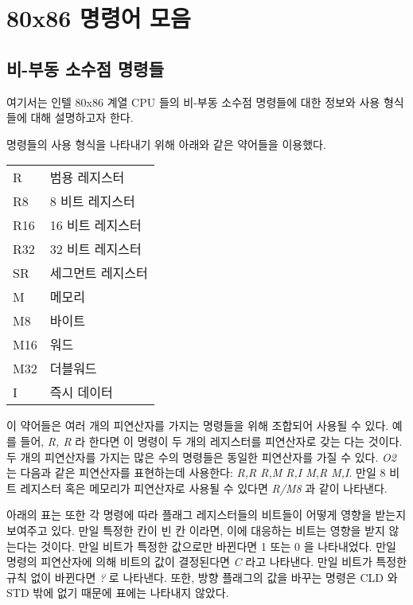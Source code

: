﻿%
\chapter{80x86 명령어 모음}
\section{비-부동 소수점 명령들}

여기서는 인텔 80x86 계열 CPU 들의 비-부동 소수점 명령들에 대한 정보와
사용 형식들에 대해 설명하고자 한다. 

명령들의 사용 형식을 나타내기 위해 아래와 같은 약어들을 이용했다.
\begin{center}
\begin{tabular}{|l|l|}
\hline
R   & 범용 레지스터 \\
R8  & 8 비트 레지스터 \\
R16 & 16 비트 레지스터 \\
R32 & 32 비트 레지스터 \\
SR  & 세그먼트 레지스터 \\
M   & 메모리 \\
M8  & 바이트 \\
M16 & 워드 \\
M32 & 더블워드 \\
I   & 즉시 데이터 \\
\hline
\end{tabular}
\end{center}
이 약어들은 여러 개의 피연산자를 가지는 명령들을 위해 조합되어 사용될 수 있다.
예를 들어, \emph{R, R} 라 한다면 이 명령이 두 개의 레지스터를 피연산자로
갖는 다는 것이다. 두 개의 피연산자를 가지는 많은 수의 명령들은 동일한 피연산자를
가질 수 있다. \emph{O2} 는 다음과 같은 피연산자를 표현하는데 사용한다: \emph{R,R R,M R,I M,R M,I}.
만일 8 비트 레지스터 혹은 메모리가 피연산자로 사용될 수 있다면 \emph{R/M8} 과 같이 나타낸다. 

아래의 표는 또한 각 명령에 따라 플래그 레지스터들의 비트들이 어떻게 영향을 받는지
보여주고 있다. 만일 특정한 칸이 빈 칸 이라면, 이에 대응하는 비트는 영향을 받지 않는다는
것이다. 만일 비트가 특정한 값으로만 바뀐다면 1 또는 0 을 나타내었다.
만일 명령의 피연산자에 의해 비트의 값이 결정된다면 \emph{C} 라고
나타낸다. 만일 비트가 특정한 규칙 없이 바뀐다면 \emph{?} 로 나타낸다. 또한, 방향 플래그의
값을 바꾸는 명령은 {\code CLD} 와 {\code STD} 밖에 없기 때문에 표에는 나타내지 않았다.

